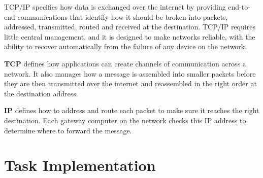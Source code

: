 \documentclass[12pt]{article}
\begin{document}
	TCP/IP specifies how data is exchanged over the internet by providing end-to-end communications that identify how it should be broken into packets, addressed, transmitted, routed and received at the destination. TCP/IP requires little central management, and it is designed to make networks reliable, with the ability to recover automatically from the failure of any device on the network.
	
	\textbf{TCP} defines how applications can create channels of communication across a network. It also manages how a message is assembled into smaller packets before they are then transmitted over the internet and reassembled in the right order at the destination address.
	
	\textbf{IP} defines how to address and route each packet to make sure it reaches the right destination. Each gateway computer on the network checks this IP address to determine where to forward the message.
	
	
	
	
	
	
	
	
	\newpage
	\section{Task Implementation}
	
\end{document}
